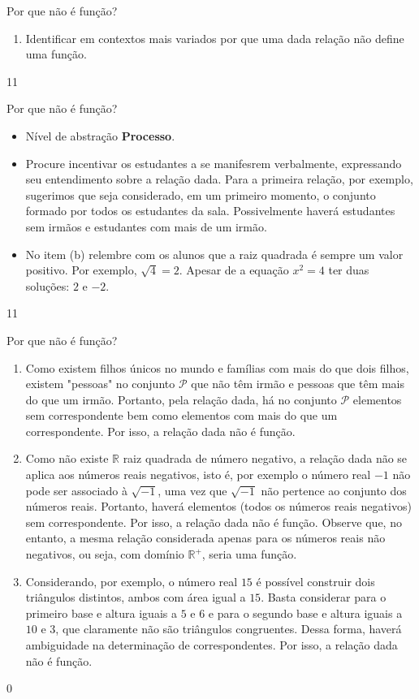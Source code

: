 \clearpage
\def\currentcolor{session3}
\begin{objectives}{Por que não é função?}
{
\begin{enumerate}

\item Identificar em contextos mais variados por que uma dada relação não define uma função.

\end{enumerate}
}{1}{1}
\end{objectives}
\begin{sugestions}{Por que não é função?}
{
\begin{itemize}
\item Nível de abstração \textbf{Processo}.

\item Procure incentivar os estudantes a se manifesrem verbalmente, expressando seu entendimento sobre a relação dada. Para a primeira relação, por exemplo, sugerimos que seja considerado, em um primeiro momento, o conjunto formado por todos os estudantes da sala. Possivelmente haverá estudantes sem irmãos e estudantes com mais de um irmão.

\item No item (b) relembre com os alunos que a raiz quadrada é sempre um valor positivo. Por exemplo, $\sqrt{4}=2$. Apesar de a equação $x^2=4$ ter duas soluções: $2$ e $−2$.
\end{itemize}
}{1}{1}
\end{sugestions}
\begin{answer}{Por que não é função?}
{
\begin{enumerate}
\item Como existem filhos únicos no mundo e famílias com mais do que dois filhos, existem "pessoas" no conjunto $\mathcal{P}$ que não têm irmão e pessoas que têm mais do que um irmão. Portanto, pela relação dada, há no conjunto $\mathcal{P}$ elementos sem correspondente bem como elementos com mais do que um correspondente. Por isso, a relação dada não é função.

\item Como não existe $\mathbb{R}$ raiz quadrada de número negativo, a relação dada não se aplica aos números reais negativos, isto é, por exemplo o número real $-1$ não pode ser associado à $\sqrt{-1}$, uma vez que $\sqrt{-1}$ não pertence ao conjunto dos números reais. Portanto, haverá elementos (todos os números reais negativos) sem correspondente. Por isso, a relação dada não é função. Observe que, no entanto, a mesma relação considerada apenas para os números reais não negativos, ou seja, com domínio $\mathbb{R}^+$, seria uma função.

\item Considerando, por exemplo, o número real $15$ é possível construir dois triângulos distintos, ambos com área igual a $15$. Basta considerar para o primeiro base e altura iguais a $5$ e $6$ e para o segundo base e altura iguais a $10$ e $3$, que claramente não são triângulos congruentes. Dessa forma, haverá ambiguidade na determinação de correspondentes. Por isso, a relação dada não é função.

\end{enumerate}
}{0}
\end{answer}
